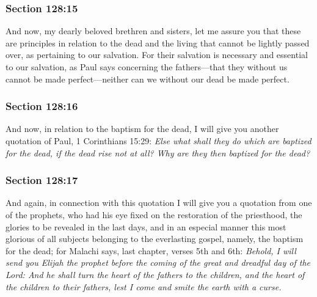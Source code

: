 	\subsubsection{Section 128:15} %
		\label{DC128-15}

		And now, my dearly beloved brethren and sisters, let me assure you that these are principles in relation to the dead and the living that cannot be lightly passed over, as pertaining to our salvation. For their salvation is necessary and essential to our salvation, as Paul says concerning the fathers---that they without us cannot be made perfect---neither can we without our dead be made perfect.


	\subsubsection{Section 128:16} %
		\label{DC128-16}

		And now, in relation to the baptism for the dead, I will give you another quotation of Paul, 1 Corinthians 15:29: \textit{Else what shall they do which are baptized for the dead, if the dead rise not at all? Why are they then baptized for the dead?}


	\subsubsection{Section 128:17} %
		\label{DC128-17}

		And again, in connection with this quotation I will give you a quotation from one of the prophets, who had his eye fixed on the restoration of the priesthood, the glories to be revealed in the last days, and in an especial manner this most glorious of all subjects belonging to the everlasting gospel, namely, the baptism for the dead; for Malachi says, last chapter, verses 5th and 6th: \textit{Behold, I will send you Elijah the prophet before the coming of the great and dreadful day of the Lord: And he shall turn the heart of the fathers to the children, and the heart of the children to their fathers, lest I come and smite the earth with a curse.}

